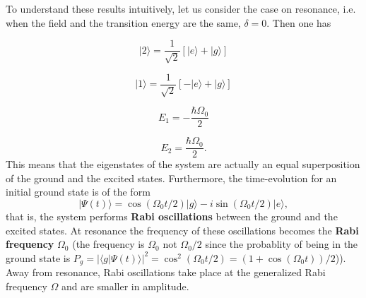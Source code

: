 \documentclass[12pt]{iopart}
\begin{document}
To understand these results intuitively, let us consider the case on resonance, i.e. when the field and the transition energy are the same, $\delta=0$. Then one has

\begin{equation}
|2\rangle =\frac{1}{\sqrt{2}}\left[|e\rangle  +|g\rangle  \right]\label{eq:68}\end{equation}


\begin{equation}
|1\rangle =\frac{1}{\sqrt{2}}\left[-|e\rangle  +|g\rangle  \right]\label{eq:69}\end{equation}


\begin{equation}
E_{1}= -\frac{\hbar \Omega_0}{2}\label{eq:70}\end{equation}

\begin{equation}
E_{2}=\frac{\hbar \Omega_0}{2}.\label{eq:70}\end{equation}
This means that the eigenstates of the system are actually an equal superposition of the ground and the excited states. Furthermore, the time-evolution 
for an initial ground state is of the form
\begin{equation}
| \Psi (t) \rangle = \cos( \Omega_0 t/2) |g\rangle - i \sin (\Omega_0 t/2) |e\rangle , \label{RabiSemiClPT}
\end{equation}
that is, the system performs {\bf Rabi oscillations} between the ground and the excited states. At resonance the frequency of these oscillations
becomes the {\bf Rabi frequency} $\Omega_0$ (the frequency is $\Omega_0$ not $\Omega_0/2$ since the probablity of being in the ground state is
$P_g = |\langle g | \Psi (t) \rangle|^2 = \cos^2 ( \Omega_0 t/2) = (1+\cos ( \Omega_0 t))/2$)). Away from resonance, Rabi oscillations take place
at the generalized Rabi frequency $\Omega$ and are smaller in amplitude.
\end{document}
